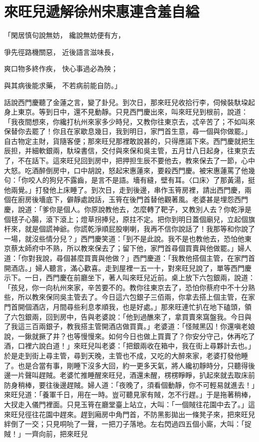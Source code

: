 %

\chapter{來旺兒遞解徐州\KG 宋惠連含羞自縊}

「閑居慎句說無妨，  纔說無妨便有方，

爭先徑路機關惡，  近後語言滋味長，

爽口物多終作疾，  快心事過必為殃；

與其病後能求藥，  不若病前能自防。」

話說西門慶聽了金蓮之言，變了卦兒。到次日，那來旺兒收拾行李，伺候裝馱垜起身上東京。等到日中，還不見動靜。只見西門慶出來，叫來旺兒到根前，說道：「我夜間想來，你纔打杭州來家多少時兒，又教你往東京去，忒辛苦了；不如叫來保替你去罷了！你且在家歇息幾日，我到明日，家門首生意，尋一個與你做罷。」自古物定主財，貨隨客便；那來旺兒那裡敢說甚的，只得應諾下來。西門慶就把生辰担，并細軟銀兩，馱垜書信，交付與來保和吳主管，五月廿八日起身，往東京去了，不在話下。這來旺兒回到房中，把押担生辰不要他去，教來保去了一節，心中大怒。吃酒醉倒房中，口中胡說，怒起宋惠蓮來，要殺西門慶。被宋惠蓮罵了他幾句：「你咬人的狗兒不露齒，是言不是語。墻有縫，壁有耳。〈口床〉了那黃湯，挺他兩覺。」打發他上床睡了。到次日，走到後邊，串作玉筲房裡，請出西門慶，兩個在廚房後墻底下，僻靜處說話，玉筲在後門首替他觀著風。老婆甚是埋怨西門慶，說道：「爹你是個人。你原說教他去，怎麼轉了靶子，又教別人去？你乾淨是個毬子心腸，滾下滾上；燈草拐捧兒，原拄不定。把你到明日蓋個廟兒，立起個旗杆來，就是個謊神爺。你謊乾淨順屁股喇喇，我再不信你說話了！我那等和你說了一場，就沒些情分兒？」西門慶笑道：「到不是此說。我不是也教他去，恐怕他東京蔡太師府中不熟，所以教來保去了；留下他，家門首尋個買賣與他做罷。」婦人道：「你對我說，尋個甚麼買賣與他做？」西門慶道：「我教他搭個主管，在家門首開酒店。」婦人聽言，滿心歡喜。走到屋裡一五一十，對來旺兒說了，單等西門慶示下。一日，西門慶在前廳坐下，著人叫來旺兒近前。桌上放下六包銀兩，說道：「孩兒，你一向杭州來家，辛苦要不的。教你往東京去了，恐怕你蔡府中不十分熟些，所以教來保同吳主管去了。今日這六包銀子三佰兩，你拿去搭上個主管，在家門首開個酒店，月間尋些利息孝順我，也是好處。」那來旺連忙扒在地下磕頭，領了六包銀兩，回到房中，告與老婆說：「他到過醮來了，拿買賣來窩盤我。今日與了我這三百兩銀子，教我搭主管開酒店做買賣。」老婆道：「怪賊黑囚！你還嗔老娘說，一鍬就撅了井？也等慢慢來。如何今日也做上買賣了？你安分守己，休再吃了酒，口裡六說白道！」來旺兒叫老婆：「把銀兩收在箱中，我在街上尋夥計去也。」於是走到街上尋主管，尋到天晚，主管也不成，又吃的大醉來家，老婆打發他睡了。也是合當有事，剛睡下沒多大回，約一更多天氣，將人纔初靜時分，只聽得後邊一片聲叫趕賊。老婆忙推睡醒來旺兒，酒還未醒，楞楞睜睜，扒起來就去取床前防身稍棒，要往後邊趕賊。婦人道：「夜晚了，須看個動靜，你不可輕易就進去！」來旺兒道：「養軍千日，用在一時。豈可聽見家有賊，怎不行趕。」于是拖著稍棒，大扠走入儀門裡面。只見玉筲在廳堂臺上站立，大叫：「一個賊往花園中去了。」這來旺兒徑往花園中趕來。趕到廂房中角門首，不防黑影拋出一條凳子來，把來旺兒絆倒了一交；只見哃喨了一聲，一把刀子落地。左右閃過四五個小廝，大叫：「捉賊！」一齊向前，把來旺兒